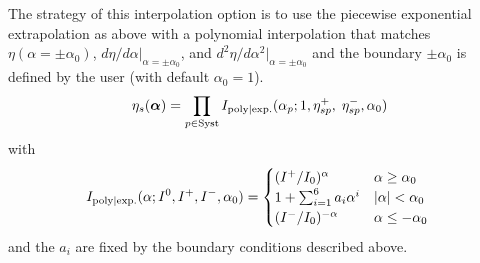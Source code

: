 The strategy of this interpolation option is to use the piecewise exponential extrapolation as above with a polynomial interpolation that matches $\eta(\alpha=\pm\alpha_0)$, $d\eta/d\alpha |_{\alpha=\pm\alpha_0}$, and $d^2\eta/d\alpha^2 |_{\alpha=\pm\alpha_0}$ and the boundary $\pm\alpha_0$ is defined by the user (with default $\alpha_0=1$).  
\begin{equation}
\eta_s ({\boldsymbol \alpha}) = \prod_{p\in\textrm{Syst}} I_{\rm poly|exp.}(\alpha_p; 1,\eta_{sp}^+, \; \eta_{sp}^- , \alpha_0) 
\end{equation}
with
\begin{equation}
 I_{\rm poly|exp.}(\alpha;  I^0, I^+,I^- , \alpha_0) =
 \begin{cases}
      (I^+/I_0)^ \alpha  &  \text{$\alpha\ge \alpha_0$} \\
     1+\sum_{i=1}^6 a_i \alpha^i  &  \text{$|\alpha|< \alpha_0$} \\
      (I^-/I_0)^{-\alpha}  &  \text{$\alpha\le-\alpha_0$ }
 \end{cases}
\end{equation}
and the $a_i$ are fixed by the boundary conditions described above.
